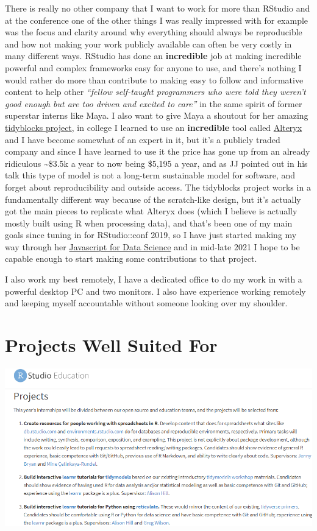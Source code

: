 \documentclass[
]{book}
\begin{document}
There is really no other company that I want to work for more than RStudio and at the conference one of the other things I was really impressed with for example was the focus and clarity around why everything should always be reproducible and how not making your work publicly available can often be very costly in many different ways. RStudio has done an \textbf{incredible} job at making incredible powerful and complex frameworks easy for anyone to use, and there's nothing I would rather do more than contribute to making easy to follow and informative content to help other \emph{``fellow self-taught programmers who were told they weren't good enough but are too driven and excited to care''} \citep{gans2020} in the same spirit of former superstar interns like Maya. I also want to give Maya a shoutout for her amazing \href{https://github.com/tidyblocks/tidyblocks}{tidyblocks project}, in college I learned to use an \textbf{incredible} tool called \href{https://www.alteryx.com/}{Alteryx} and I have become somewhat of an expert in it, but it's a publicly traded company and since I have learned to use it the price has gone up from an already ridiculous \textasciitilde\$3.5k a year to now being \$5,195 a year, and as JJ pointed out in his talk this type of model is not a long-term sustainable model for software, and forget about reproducibility and outside access. The tidyblocks project works in a fundamentally different way because of the scratch-like design, but it's actually got the main pieces to replicate what Alteryx does (which I believe is actually mostly built using R when processing data), and that's been one of my main goals since tuning in for RStudio::conf 2019, so I have just started making my way through her \href{http://js4ds.org/}{Javascript for Data Science} and in mid-late 2021 I hope to be capable enough to start making some contributions to that project.

I also work my best remotely, I have a dedicated office to do my work in with a powerful desktop PC and two monitors. I also have experience working remotely and keeping myself accountable without someone looking over my shoulder.

\hypertarget{ideal-projects}{%
\chapter{Projects Well Suited For}\label{ideal-projects}}

\includegraphics{images/projects_list.png}
\end{document}
